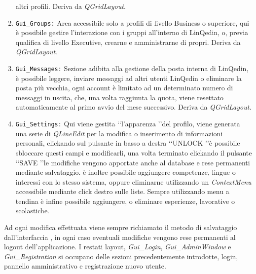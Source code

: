 \begin{enumerate}
    altri profili. Deriva da \textit{QGridLayout}.
    \item
    \texttt{Gui\_Groups:} Area accessibile solo a profili di livello Business o superiore, qui è possibile gestire l'interazione con i gruppi all'interno di LinQedin, o, previa qualifica di livello Executive,
    crearne e amministrarne di propri. Deriva da \textit{QGridLayout}.
    \item
    \texttt{Gui\_Messages:} Sezione adibita alla gestione della posta interna di LinQedin, è possibile leggere, inviare messaggi ad altri utenti LinQedin o eliminare la posta più vecchia, ogni account è limitato
    ad un determinato numero di messaggi in uscita, che, una volta raggiunta la quota, viene resettato automaticamente al primo avvio del mese successivo. Deriva da \textit{QGridLayout}.
    \item
    \texttt{Gui\_Settings:} Qui viene gestita \lq\lq l'apparenza \rq\rq del profilo, viene generata una serie di \textit{QLineEdit} per la modifica o inserimento di informazioni personali, clickando sul pulsante in basso
    a destra \lq\lq UNLOCK \rq\rq è possibile sbloccare questi campi e modificarli, una volta terminato clickando il pulsante \lq\lq SAVE \rq\rq le modifiche vengono apportate anche al database e rese permanenti mediante
    salvataggio.
    è inoltre possibile aggiungere competenze, lingue o interessi con lo stesso sistema, oppure eliminarne utilizzando un \textit{ContextMenu} accessibile mediante click destro sulle liste. Sempre utilizzando menu a tendina
    è infine possibile aggiungere, o eliminare esperienze, lavorative o scolastiche.
\end{enumerate}
Ad ogni modifica effettuata viene sempre richiamato il metodo di salvataggio dall'interfaccia , in ogni caso eventuali modifiche vengono rese permanenti al logout dell'applicazione.
I restati layout, \textit{Gui\_Login}, \textit{Gui\_AdminWindow} e \textit{Gui\_Registration} si occupano delle sezioni precedentemente introdotte, login, pannello amministrativo e registrazione nuovo utente.